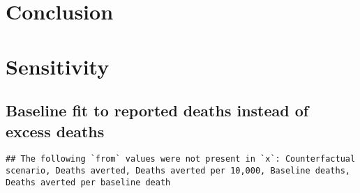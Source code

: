 \documentclass{article}
\begin{document}
\hypertarget{conclusion}{%
\section{Conclusion}\label{conclusion}}



\hypertarget{appendix-appendix}{%
\appendix}


\hypertarget{sensitivity}{%
\section{Sensitivity}\label{sensitivity}}

\hypertarget{baseline-fit-to-reported-deaths-instead-of-excess-deaths}{%
\subsection{Baseline fit to reported deaths instead of excess deaths}\label{baseline-fit-to-reported-deaths-instead-of-excess-deaths}}

\begin{verbatim}
## The following `from` values were not present in `x`: Counterfactual scenario, Deaths averted, Deaths averted per 10,000, Baseline deaths, Deaths averted per baseline death
\end{verbatim}
\end{document}
